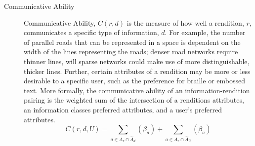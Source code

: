 \begin{description}
\item[Communicative Ability]
Communicative Ability, $C(r,d)$ is the measure of how well a rendition, $r$, communicates a specific type of information, $d$.
For example, the number of parallel roads that can be represented in a space is dependent on the width of the lines representing the roads; denser road networks require thinner lines, will sparse networks could make use of more distinguishable, thicker lines. Further, certain attributes of a rendition may be more or less desirable to a specific user, such as the preference for braille or embossed text. 
More formally, the communicative ability of an information-rendition pairing is the weighted sum of the intersection of a renditions attributes, an information classes preferred attributes, and a user's preferred attributes. 
\begin{equation}
\label{eq::communicability}
C(r,d,U) = \sum_{a\in A_r \cap \hat{A}_d}(\beta_a) +  \sum _{a\in A_r \cap \hat{A}_U}(\beta_a)
\end{equation}


\end{description}
